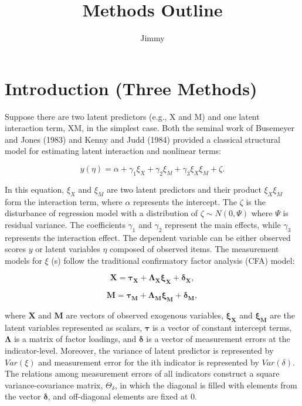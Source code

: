 \documentclass[
  man]{apa7}
\title{Methods Outline}
\author{Jimmy\textsuperscript{}}
\date{}
\affiliation{\phantom{0}}
\begin{document}
\maketitle

\hypertarget{introduction-three-methods}{%
\section{Introduction (Three Methods)}\label{introduction-three-methods}}

Suppose there are two latent predictors (e.g., X and M) and one latent interaction term, XM, in the simplest case. Both the seminal work of Busemeyer and Jones (1983) and Kenny and Judd (1984) provided a classical structural model for estimating latent interaction and nonlinear terms:

\begin{equation}
y (\eta) = \alpha + \gamma_{1}\xi_{X} + \gamma_{2}\xi_{M} + \gamma_{3}\xi_{X}\xi_{M} + \zeta.
\end{equation}

In this equation, \(\xi_{X}\) and \(\xi_{M}\) are two latent predictors and their product \(\xi_{X}\xi_{M}\) form the interaction term, where \(\alpha\) represents the intercept. The \(\zeta\) is the disturbance of regression model with a distribution of \(\zeta \sim N(0, \Psi)\) where \(\Psi\) is residual variance. The coefficients \(\gamma_{1}\) and \(\gamma_{2}\) represent the main effects, while \(\gamma_{3}\) represents the interaction effect. The dependent variable can be either observed scores \(y\) or latent variables \(\eta\) composed of observed items. The measurement models for \(\xi\) (s) follow the traditional confirmatory factor analysis (CFA) model:

\begin{equation}
\textbf{X} = \boldsymbol{\tau_{X}} + \boldsymbol{\Lambda_{X}\xi_{X}} + \boldsymbol{\delta_{X}},
\end{equation}

\begin{equation}
\textbf{M} = \boldsymbol{\tau_{M}} + \boldsymbol{\Lambda_{M}\xi_{M}} + \boldsymbol{\delta_{M}},
\end{equation}

where \(\textbf{X}\) and \(\textbf{M}\) are vectors of observed exogenous variables, \(\boldsymbol{\xi_{X}}\) and \(\boldsymbol{\xi_{M}}\) are the latent variables represented as scalars, \(\boldsymbol{{\tau}}\) is a vector of constant intercept terms, \(\boldsymbol{\Lambda}\) is a matrix of factor loadings, and \(\boldsymbol{\delta}\) is a vector of measurement errors at the indicator-level. Moreover, the variance of latent predictor is represented by \(Var(\xi)\) and measurement error for the ith indicator is represented by \(Var(\delta)\). The relations among measurement errors of all indicators construct a square variance-covariance matrix, \(\Theta_{\delta}\), in which the diagonal is filled with elements from the vector \(\boldsymbol{\delta}\), and off-diagonal elements are fixed at 0.
\end{document}
